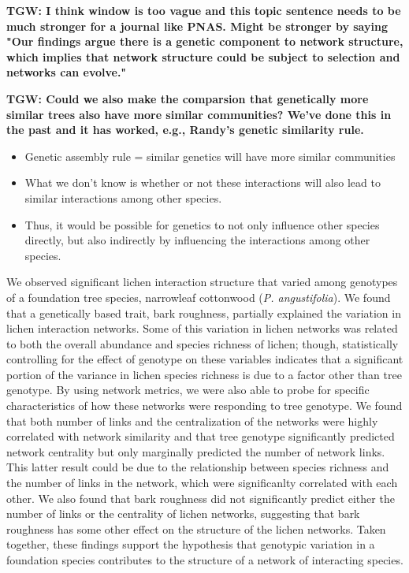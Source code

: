 \documentclass[11pt,twocolumn,twoside,lineno]{pnas-new}
\begin{document}
\textbf{TGW: I think window is too vague and this topic sentence needs
  to be much stronger for a journal like PNAS.  Might be stronger by
  saying "Our findings argue there is a genetic component to network
  structure, which implies that network structure could be subject to
  selection and networks can evolve."}

\textbf{TGW: Could we also make the comparsion that genetically more
  similar trees also have more similar communities?  We've done this
  in the past and it has worked, e.g., Randy's genetic similarity
  rule.}

\begin{itemize}
\item Genetic assembly rule = similar genetics will have more similar
  communities
\item What we don't know is whether or not these interactions will
  also lead to similar interactions among other species.
\item Thus, it would be possible for genetics to not only influence
  other species directly, but also indirectly by influencing the
  interactions among other species.
\end{itemize}

We observed significant lichen interaction structure that varied among
genotypes of a foundation tree species, narrowleaf cottonwood
(\textit{P. angustifolia}). We found that a genetically based trait,
bark roughness, partially explained the variation in lichen
interaction networks. Some of this variation in lichen networks was
related to both the overall abundance and species richness of lichen;
though, statistically controlling for the effect of genotype on these
variables indicates that a significant portion of the variance in
lichen species richness is due to a factor other than tree
genotype. By using network metrics, we were also able to probe for
specific characteristics of how these networks were responding to tree
genotype. We found that both number of links and the centralization of
the networks were highly correlated with network similarity and that
tree genotype significantly predicted network centrality but only
marginally predicted the number of network links. This latter result
could be due to the relationship between species richness and the
number of links in the network, which were significanlty correlated
with each other. We also found that bark roughness did not
significantly predict either the number of links or the centrality of
lichen networks, suggesting that bark roughness has some other effect
on the structure of the lichen networks. Taken together, these
findings support the hypothesis that genotypic variation in a
foundation species contributes to the structure of a network of
interacting species.
\end{document}
